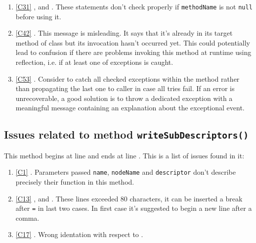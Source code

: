 \begin{enumerate}
	\item \ref{C31} ,  and . These statements don't check properly if \texttt{methodName} is not \texttt{null} before using it.
	\item \ref{C42} . This message is misleading. It says that it's already in its target method of class but its invocation hasn't occurred yet. This could potentially lead to confusion if there are problems invoking this method at runtime using reflection, i.e. if at least one of exceptions is caught.
	\item \ref{C53} . Consider to catch all checked exceptions within the method rather than propagating the last one to caller in case all tries fail. If an error is unrecoverable, a good solution is to throw a dedicated exception with a meaningful message containing an explanation about the exceptional event. 
\end{enumerate}

\subsection{Issues related to method \texttt{writeSubDescriptors()}}
This method begins at line  and ends at line . This is a list of issues found in it:
\begin{enumerate}
\item \ref{C1} . Parameters passed \texttt{name}, \texttt{nodeName} and \texttt{descriptor} don't describe precisely their function in this method.
\item \ref{C13} ,  and . These lines exceeded 80 characters, it can be inserted a break after \texttt{=} in last two cases. In first case it's suggested to begin a new line after a comma.
\item \ref{C17} . Wrong identation with respect to . 
\end{enumerate}
